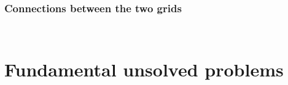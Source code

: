 \documentclass[aspectratio=169]{beamer}
\begin{document}
\begin{frame}
    \frametitle{Connections between the two grids}
    \begin{columns}
        \begin{column}{0.5\textwidth}
            \begin{figure}[ht]\centering
            \end{figure}
        \end{column}
        \begin{column}{0.5\textwidth}
            \begin{figure}[ht]\centering
            \end{figure}
        \end{column}
    \end{columns}
\end{frame}

\section{Fundamental unsolved problems}
\end{document}
